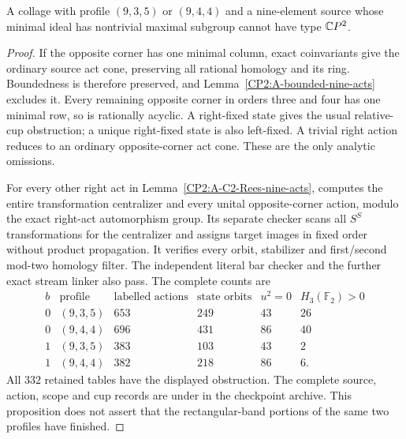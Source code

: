 \begin{proposition}
\label{CP2:A-C2-Rees-nine-bisets}
A collage with profile $(9,3,5)$ or $(9,4,4)$ and a
nine-element source whose minimal ideal has nontrivial
maximal subgroup cannot have type $\mathbb{C}P^2$.
\end{proposition}
\begin{proof}
If the opposite corner has one minimal column, exact
coinvariants give the ordinary source act cone, preserving
all rational homology and its ring. Boundedness is therefore
preserved, and Lemma~\ref{CP2:A-bounded-nine-acts} excludes it.
Every remaining opposite corner in orders three and four
has one minimal row, so is rationally acyclic. A right-fixed
state gives the usual relative-cup obstruction; a unique
right-fixed state is also left-fixed. A trivial right action
reduces to an ordinary opposite-corner act cone. These are
the only analytic omissions.

For every other right act in Lemma~\ref{CP2:A-C2-Rees-nine-acts},
 computes the entire
transformation centralizer and every unital opposite-corner
action, modulo the exact right-act automorphism group.
Its separate checker
 scans all $S^S$
transformations for the centralizer and assigns target
images in fixed order without product propagation.
It verifies every orbit, stabilizer and first/second
mod-two homology filter. The independent literal bar
checker and the further exact stream linker also pass.
The complete counts are
\[
\begin{array}{c|c|r|r|r|r}
 b&\text{profile}&\text{labelled actions}&\text{state orbits}
 &u^2=0&H_3(\mathbb F_2)>0\\\hline
0&(9,3,5)&653&249&43&26\\
0&(9,4,4)&696&431&86&40\\
1&(9,3,5)&383&103&43&2\\
1&(9,4,4)&382&218&86&6.
\end{array}
\]
All $332$ retained tables have the displayed obstruction.
The complete source, action, scope and cup records are
under  in the
checkpoint archive. This proposition does not assert that
the rectangular-band portions of the same two profiles
have finished.
\end{proof}
